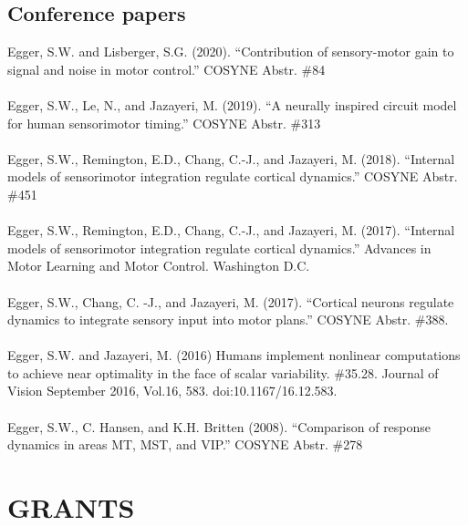 \documentclass[a4paper,9pt]{extarticle}
\begin{document}
    \subsection*{Conference papers}
    Egger, S.W. and Lisberger, S.G. (2020). “Contribution of sensory-motor gain to signal and noise in motor control.” COSYNE Abstr. \#84 \\
    \\
    Egger, S.W., Le, N., and Jazayeri, M. (2019). “A neurally inspired circuit model for human sensorimotor timing.” COSYNE Abstr. \#313 \\ 
    \\
    Egger, S.W., Remington, E.D., Chang, C.-J., and Jazayeri, M. (2018). “Internal models of sensorimotor integration regulate cortical dynamics.” COSYNE Abstr. \#451 \\
    \\
    Egger, S.W., Remington, E.D., Chang, C.-J., and Jazayeri, M. (2017). “Internal models of sensorimotor integration regulate cortical dynamics.” Advances in Motor Learning and Motor Control. Washington D.C.\\
    \\
    Egger, S.W., Chang, C. -J., and Jazayeri, M. (2017). “Cortical neurons regulate dynamics to integrate sensory input into motor plans.” COSYNE Abstr. \#388.\\
    \\
    Egger, S.W. and Jazayeri, M. (2016)  Humans implement nonlinear computations to achieve near optimality in the face of scalar variability. \#35.28. Journal of Vision September 2016, Vol.16, 583. doi:10.1167/16.12.583. \\
    \\
    Egger, S.W., C. Hansen, and K.H. Britten (2008). “Comparison of response dynamics in areas MT, MST, and VIP.” COSYNE Abstr. \#278 \\
    

\section*{GRANTS}
\end{document}

